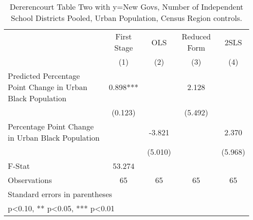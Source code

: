 \begin{table}[htbp]\centering
\def\sym#1{\ifmmode^{#1}\else\(^{#1}\)\fi}
\caption{Dererencourt Table Two with y=New Govs, Number of Independent School Districts  Pooled, Urban Population, Census Region controls.}
\begin{tabular}{l*{4}{c}}
\toprule
                    & First Stage   &         OLS   &Reduced Form   &        2SLS   \\
                    &\multicolumn{1}{c}{(1)}   &\multicolumn{1}{c}{(2)}   &\multicolumn{1}{c}{(3)}   &\multicolumn{1}{c}{(4)}   \\
\midrule
Predicted Percentage Point Change in Urban Black Population&       0.898***&               &       2.128   &               \\
                    &     (0.123)   &               &     (5.492)   &               \\
\addlinespace
Percentage Point Change in Urban Black Population&               &      -3.821   &               &       2.370   \\
                    &               &     (5.010)   &               &     (5.968)   \\
\midrule
F-Stat              &      53.274   &               &               &               \\
Observations        &          65   &          65   &          65   &          65   \\
\bottomrule
\multicolumn{5}{l}{\footnotesize Standard errors in parentheses}\\
\multicolumn{5}{l}{\footnotesize * p<0.10, ** p<0.05, *** p<0.01}\\
\end{tabular}
\end{table}

